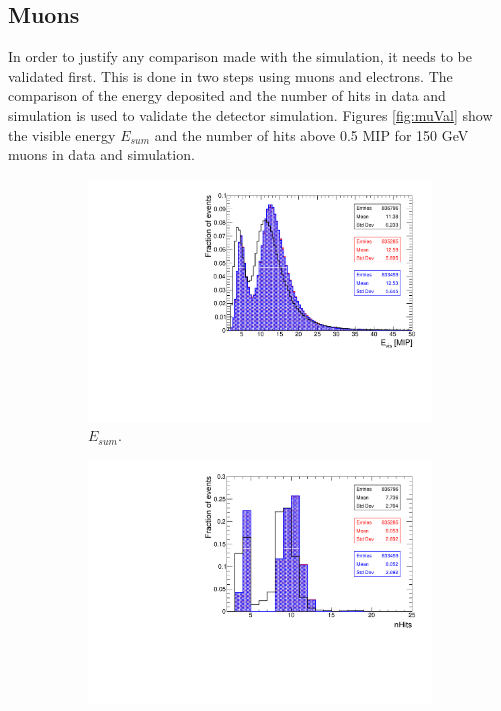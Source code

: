 \subsection{Muons}

In order to justify any comparison made with the simulation, it needs to be validated first. This is done in two steps using muons and electrons. The comparison of the energy deposited and the number of hits in data and simulation is used to validate the detector simulation. Figures \ref{fig:muVal} show the visible energy $E_{sum}$ and the number of hits above 0.5 MIP for 150 GeV muons in data and simulation.

\begin{figure}[htbp!]
  \centering
  \begin{subfigure}[t]{0.49\textwidth}
    \includegraphics[width=1.\linewidth]{../Thesis_Plots/Timing/Muons/Plots/Validation_Evis_Muons.pdf}
    \caption{$E_{sum}$.} \label{fig:muEvis}
  \end{subfigure}
  \hfill
  \begin{subfigure}[t]{0.49\textwidth}
    \includegraphics[width=1.\linewidth]{../Thesis_Plots/Timing/Muons/Plots/Validation_nHits_Muons.pdf}

\end{subfigure}
\end{figure}

